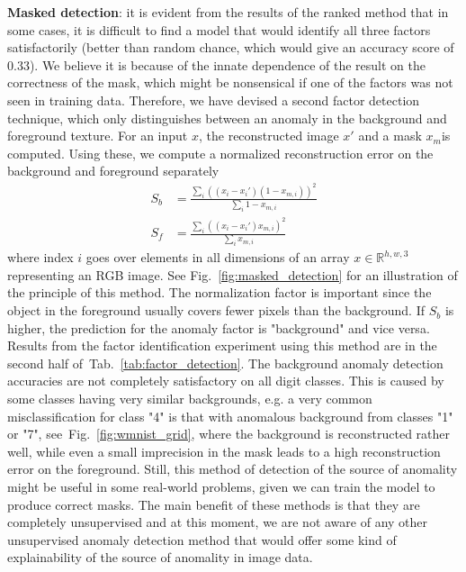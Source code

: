 \textbf{Masked detection}: it is evident from the results of the ranked method that in some cases, it is difficult to find a model that would identify all three factors satisfactorily (better than random chance, which would give an accuracy score of 0.33). We believe it is because of the innate dependence of the result on the correctness of the mask, which might be nonsensical if one of the factors was not seen in training data. Therefore, we have devised a second factor detection technique, which only distinguishes between an anomaly in the background and foreground texture. For an input $x$, the reconstructed image $x'$ and a mask $x_m$is computed. Using these, we compute a normalized reconstruction error on the background and foreground separately
\begin{align}
    S_b & = \frac{\sum_i \left( (x_i-x_{i}') (1-x_{m,i}) \right) ^ 2}{\sum_i 1-x_{m,i}} \label{eq:sb} \\
    S_f & = \frac{\sum_i \left( (x_i-x_{i}') x_{m,i} \right) ^ 2}{\sum_i x_{m,i}}  \label{eq:sf}
\end{align}
where index $i$ goes over elements in all dimensions of an array $x \in \mathbb{R}^{h,w,3}$ representing an RGB image. See Fig.~\ref{fig:masked_detection} for an illustration of the principle of this method. The normalization factor is important since the object in the foreground usually covers fewer pixels than the background. If $S_b$ is higher, the prediction for the anomaly factor is "background" and vice versa. Results from the factor identification experiment using this method are in the second half of~Tab.~\ref{tab:factor_detection}. The background anomaly detection accuracies are not completely satisfactory on all digit classes. This is caused by some classes having very similar backgrounds, e.g. a very common misclassification for class "4" is that with anomalous background from classes "1" or "7", see~Fig.~\ref{fig:wmnist_grid}, where the background is reconstructed rather well, while even a small imprecision in the mask leads to a high reconstruction error on the foreground. Still, this method of detection of the source of anomality might be useful in some real-world problems, given we can train the model to produce correct masks. The main benefit of these methods is that they are completely unsupervised and at this moment, we are not aware of any other unsupervised anomaly detection method that would offer some kind of explainability of the source of anomality in image data.

